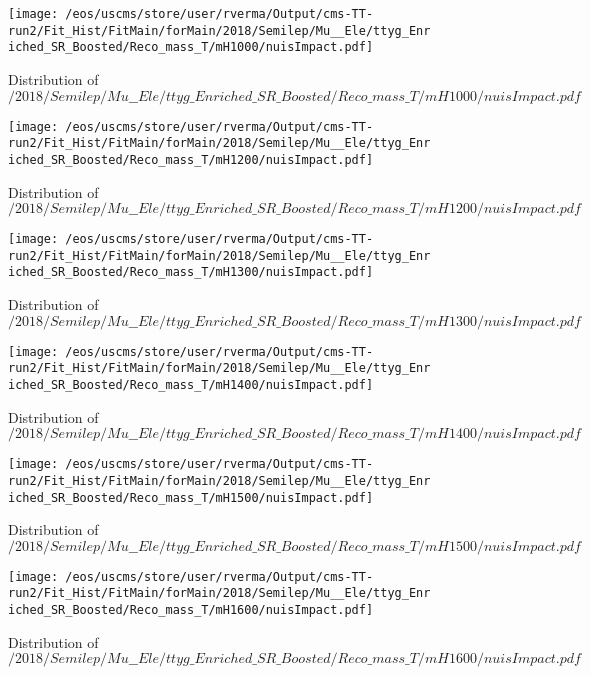 \begin{figure}
\centering
\texttt{[image: /eos/uscms/store/user/rverma/Output/cms-TT-run2/Fit\_Hist/FitMain/forMain/2018/Semilep/Mu\_\_Ele/ttyg\_Enriched\_SR\_Boosted/Reco\_mass\_T/mH1000/nuisImpact.pdf]}
\caption{Distribution of $/2018/Semilep/Mu\_\_Ele/ttyg\_Enriched\_SR\_Boosted/Reco\_mass\_T/mH1000/nuisImpact.pdf$}
\end{figure}

\begin{figure}
\centering
\texttt{[image: /eos/uscms/store/user/rverma/Output/cms-TT-run2/Fit\_Hist/FitMain/forMain/2018/Semilep/Mu\_\_Ele/ttyg\_Enriched\_SR\_Boosted/Reco\_mass\_T/mH1200/nuisImpact.pdf]}
\caption{Distribution of $/2018/Semilep/Mu\_\_Ele/ttyg\_Enriched\_SR\_Boosted/Reco\_mass\_T/mH1200/nuisImpact.pdf$}
\end{figure}

\begin{figure}
\centering
\texttt{[image: /eos/uscms/store/user/rverma/Output/cms-TT-run2/Fit\_Hist/FitMain/forMain/2018/Semilep/Mu\_\_Ele/ttyg\_Enriched\_SR\_Boosted/Reco\_mass\_T/mH1300/nuisImpact.pdf]}
\caption{Distribution of $/2018/Semilep/Mu\_\_Ele/ttyg\_Enriched\_SR\_Boosted/Reco\_mass\_T/mH1300/nuisImpact.pdf$}
\end{figure}

\begin{figure}
\centering
\texttt{[image: /eos/uscms/store/user/rverma/Output/cms-TT-run2/Fit\_Hist/FitMain/forMain/2018/Semilep/Mu\_\_Ele/ttyg\_Enriched\_SR\_Boosted/Reco\_mass\_T/mH1400/nuisImpact.pdf]}
\caption{Distribution of $/2018/Semilep/Mu\_\_Ele/ttyg\_Enriched\_SR\_Boosted/Reco\_mass\_T/mH1400/nuisImpact.pdf$}
\end{figure}

\begin{figure}
\centering
\texttt{[image: /eos/uscms/store/user/rverma/Output/cms-TT-run2/Fit\_Hist/FitMain/forMain/2018/Semilep/Mu\_\_Ele/ttyg\_Enriched\_SR\_Boosted/Reco\_mass\_T/mH1500/nuisImpact.pdf]}
\caption{Distribution of $/2018/Semilep/Mu\_\_Ele/ttyg\_Enriched\_SR\_Boosted/Reco\_mass\_T/mH1500/nuisImpact.pdf$}
\end{figure}

\begin{figure}
\centering
\texttt{[image: /eos/uscms/store/user/rverma/Output/cms-TT-run2/Fit\_Hist/FitMain/forMain/2018/Semilep/Mu\_\_Ele/ttyg\_Enriched\_SR\_Boosted/Reco\_mass\_T/mH1600/nuisImpact.pdf]}
\caption{Distribution of $/2018/Semilep/Mu\_\_Ele/ttyg\_Enriched\_SR\_Boosted/Reco\_mass\_T/mH1600/nuisImpact.pdf$}
\end{figure}

